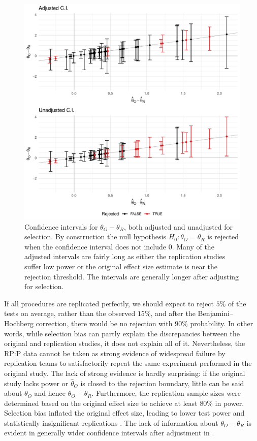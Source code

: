 \documentclass[aoas, preprint]{imsart}
\theoremstyle{definition}
\theoremstyle{custom}
\newcommand{\htheta}{\hat{\theta}}
\begin{document}
  \begin{figure}[htbp]
    \centering
    \includegraphics[width=\hsize]{ci}
    \caption{Confidence intervals for $\theta_O - \theta_R$, both adjusted and unadjusted for selection. By construction the null hypothesis $H_0: \theta_O = \theta_R$ is rejected when the confidence interval does not include $0$. Many of the adjusted intervals are fairly long as either the replication studies suffer low power or the original effect size estimate is near the rejection threshold. The intervals are generally longer after adjusting for selection.}
  \label{fig:ci}
  \end{figure}

  If all procedures are replicated perfectly, we should expect to reject $5\%$ of the tests on average, rather than the observed $15\%$, and after the Benjamini--Hochberg correction, there would be no rejection with $90\%$ probability. In other words, while selection bias can partly explain the discrepancies between the original and replication studies, it does not explain all of it. Nevertheless, the RP:P data cannot be taken as strong evidence of widespread failure by replication teams to satisfactorily repeat the same experiment performed in the original study. The lack of strong evidence is hardly surprising: if the original study lacks power \citep{Morey:2017} or $\htheta_O$ is closed to the rejection boundary, little can be said about $\theta_O$ and hence $\theta_O - \theta_R$. Furthermore, the replication sample sizes were determined based on the original effect size to achieve at least $80\%$ in power. Selection bias inflated the original effect size, leading to lower test power and statistically insignificant replications \citep{Etz:2016gx,Camerer:2018de}. The lack of information about $\theta_O - \theta_R$ is evident in generally wider confidence intervals after adjustment in .
\end{document}
